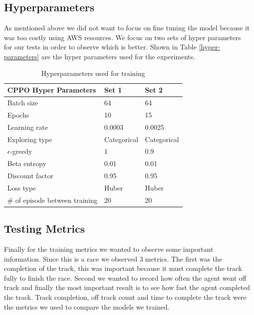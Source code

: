 \documentclass[journal]{IEEEtran}
\begin{document}
\subsection{Hyperparameters}
As mentioned above we did not want to focus on fine tuning the model because it was too costly using AWS resources. We focus on two sets of hyper parameters for our tests in order to observe which is better.  Shown in Table \ref{hyper-parameters} are the hyper parameters used for the experiments.

\begin{table}
\centering
\caption{Hyperparameters used for training}
\begin{tabular}{ | m{4cm} | m{4em}| m{4em} | } 
\hline
\textbf{CPPO Hyper Parameters} & \textbf{Set 1} & \textbf{Set 2} \\ 
\hline
Batch size & 64 & 64 \\ 
\hline
Epochs & 10 & 15 \\ 
\hline
Learning rate & 0.0003 & 0.0025 \\ 
\hline
Exploring type & Categorical & Categorical \\ 
\hline
$\epsilon$-greedy & 1 & 0.9 \\ 
\hline
Beta entropy & 0.01 & 0.01 \\ 
\hline
Discount factor & 0.95 & 0.95 \\ 
\hline
Loss type & Huber & Huber \\ 
\hline
\# of episode between training & 20 & 20 \\ 
\hline
\end{tabular}
\label{Hyperparameters}
\end{table}

\subsection{Testing Metrics}
Finally for the training metrics we wanted to observe some important information.  Since this is a race we observed 3 metrics.  The first was the completion of the track, this was important because it must complete the track fully to finish the race.  Second we wanted to record how often the agent went off track and finally the most important result is to see how fast the agent completed the track.  Track completion, off track count and time to complete the track were the metrics we used to compare the models we trained.
\end{document}
